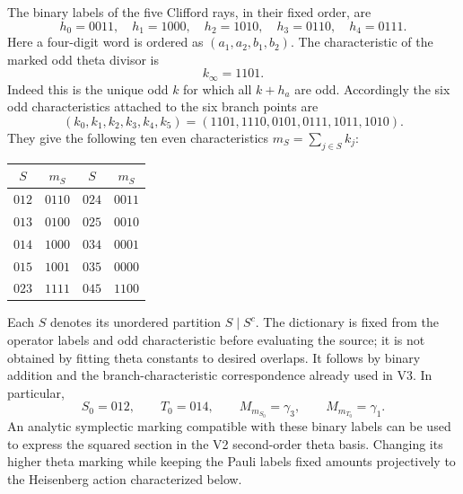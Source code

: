 \documentclass[11pt]{article}
\theoremstyle{definition}
\theoremstyle{remark}
\begin{document}
The binary labels of the five Clifford rays, in their fixed order, are
\begin{equation}
 h_0=0011,\quad h_1=1000,\quad h_2=1010,\quad
 h_3=0110,\quad h_4=0111.
 \label{eq:v4-h-labels}
\end{equation}
Here a four-digit word is ordered as $(a_1,a_2,b_1,b_2)$. The characteristic
of the marked odd theta divisor is
\[
 k_\infty=1101.
\]
Indeed this is the unique odd $k$ for which all $k+h_a$ are odd. Accordingly
the six odd characteristics attached to the six branch points are
\begin{equation}
 (k_0,k_1,k_2,k_3,k_4,k_5)
 =(1101,1110,0101,0111,1011,1010).
 \label{eq:v4-odd-dictionary}
\end{equation}
They give the following ten even characteristics $m_S=\sum_{j\in S}k_j$:
\begin{center}
\begin{tabular}{cc@{\qquad}cc}
\toprule
$S$ & $m_S$ & $S$ & $m_S$\\\midrule
$012$&$0110$&$024$&$0011$\\
$013$&$0100$&$025$&$0010$\\
$014$&$1000$&$034$&$0001$\\
$015$&$1001$&$035$&$0000$\\
$023$&$1111$&$045$&$1100$\\\bottomrule
\end{tabular}
\end{center}
Each $S$ denotes its unordered partition $S\mid S^c$. The dictionary is
fixed from the operator labels and odd characteristic before evaluating the
source; it is not obtained by fitting theta constants to desired overlaps.
It follows by binary addition and the branch-characteristic correspondence
already used in V3. In particular,
\begin{equation}
 S_0=012,\qquad T_0=014,\qquad
 M_{m_{S_0}}=\gamma_3,\qquad M_{m_{T_0}}=\gamma_1.
 \label{eq:v4-test-covariants}
\end{equation}
An analytic symplectic marking compatible with these binary labels can be
used to express the squared section in the V2 second-order theta basis.
Changing its higher theta marking while keeping the Pauli labels fixed
amounts projectively to the Heisenberg action characterized below.
\end{document}
